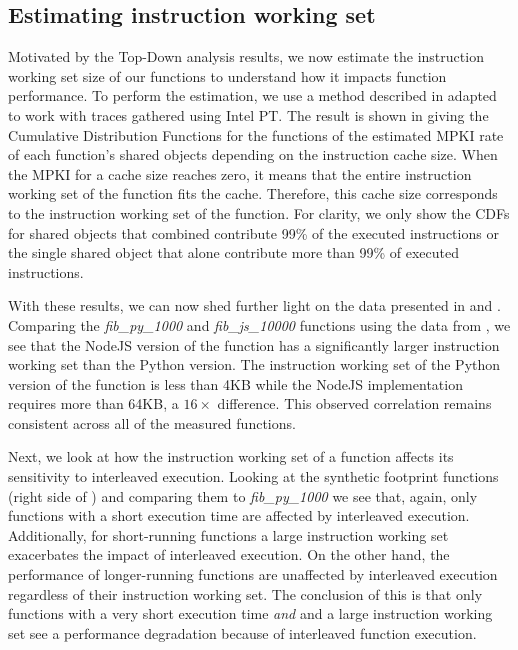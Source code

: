 \subsection{Estimating instruction working set}

\label{subsec:footprint}

Motivated by the Top-Down analysis results, we now estimate the instruction working set size of our functions to understand how it impacts function performance. To perform the estimation, we use a method described in  \cite{splash2} adapted to work with traces gathered using Intel PT. The result is shown in  giving the Cumulative Distribution Functions for the functions of the estimated MPKI rate of each function's shared objects depending on the instruction cache size. When the MPKI for a cache size reaches zero, it means that the entire instruction working set of the function fits the cache. Therefore, this cache size corresponds to the instruction working set of the function. For clarity, we only show the CDFs for shared objects that combined contribute 99\% of the executed instructions or the single shared object that alone contribute more than 99\% of executed instructions.


With these results, we can now shed further light on the data presented in  and . Comparing the \emph{fib\_py\_1000} and \emph{fib\_js\_10000} functions using the data from  , we see that the NodeJS version of the function has a significantly larger instruction working set than the Python version. The instruction working set of the Python version of the function is less than 4KB while the NodeJS implementation requires more than 64KB, a $16\times$ difference. This observed correlation remains consistent across all of the measured functions.


Next, we look at how the instruction working set of a function affects its sensitivity to interleaved execution. Looking at the synthetic footprint functions (right side of ) and comparing them to \emph{fib\_py\_1000} we see that, again, only functions with a short execution time are affected by interleaved execution. Additionally, for short-running functions a large instruction working set exacerbates the impact of interleaved execution. On the other hand, the performance of longer-running functions are unaffected by interleaved execution regardless of their instruction working set. The conclusion of this is that only functions with a very short execution time \emph{and} and a large instruction working set see a performance degradation because of interleaved function execution.


